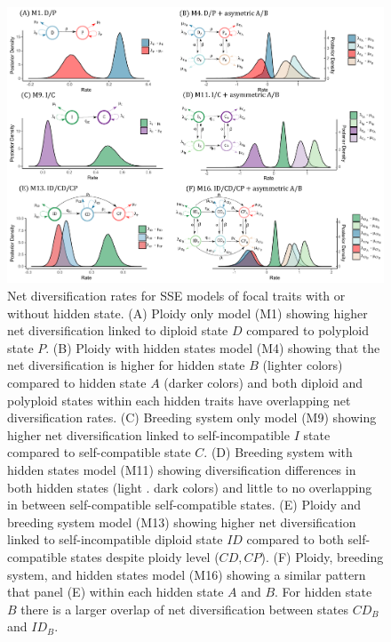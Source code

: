 \begin{figure}
\includegraphics[width=\textwidth]{fig2.pdf} 
\caption{Net diversification rates for SSE models of focal traits with or without hidden state. 
(A) Ploidy only model (M1) showing higher net diversification linked to diploid state $D$ compared to polyploid state $P$.
(B) Ploidy with hidden states model (M4) showing that the net diversification is higher for hidden state $B$ (lighter colors) compared to hidden state $A$ (darker colors) and both diploid and polyploid states within each hidden traits have overlapping net diversification rates.
(C) Breeding system only model (M9) showing higher net diversification linked to self-incompatible $I$ state compared to self-compatible state $C$.
(D) Breeding system with hidden states model (M11) showing diversification differences in both hidden states (light \vs. dark colors) and little to no overlapping in between self-compatible \vs self-compatible states.
(E) Ploidy and breeding system model (M13) showing higher net diversification linked to self-incompatible diploid state $ID$ compared to both self-compatible states despite ploidy level ($CD, CP$).
(F) Ploidy, breeding system, and hidden states model (M16) showing a similar pattern that panel (E) within each hidden state $A$ and $B$. For hidden state $B$ there is a larger overlap of net diversification between states $CD_B$ and $ID_B$.}
\label{figure:netdivall}
\end{figure}

